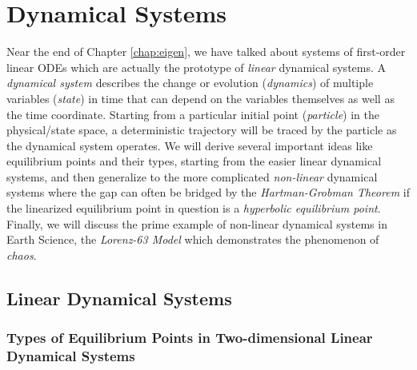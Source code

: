 \chapter{Dynamical Systems}

Near the end of Chapter \ref{chap:eigen}, we have talked about systems of first-order linear ODEs which are actually the prototype of \textit{linear} dynamical systems. A \textit{dynamical system} describes the change or evolution (\textit{dynamics}) of multiple variables (\textit{state}) in time that can depend on the variables themselves as well as the time coordinate. Starting from a particular initial point (\textit{particle}) in the physical/state space, a deterministic trajectory will be traced by the particle as the dynamical system operates. We will derive several important ideas like equilibrium points and their types, starting from the easier linear dynamical systems, and then generalize to the more complicated \textit{non-linear} dynamical systems where the gap can often be bridged by the \textit{Hartman-Grobman Theorem} if the linearized equilibrium point in question is a \textit{hyperbolic equilibrium point}. Finally, we will discuss the prime example of non-linear dynamical systems in Earth Science, the \textit{Lorenz-63 Model} which demonstrates the phenomenon of \textit{chaos}.

\section{Linear Dynamical Systems}

\subsection{Types of Equilibrium Points in Two-dimensional Linear Dynamical Systems}

